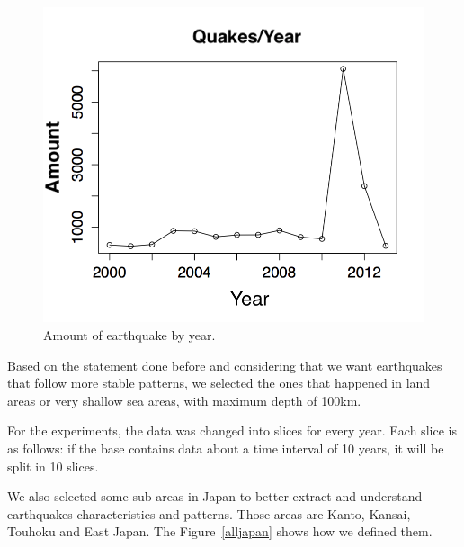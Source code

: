 \begin{figure}[]
\centering
\includegraphics[scale=0.5]{img/ocorrenciasAno.png}
\caption{Amount of earthquake by year.}
\label{ocorrenciasAno}
\end{figure}


Based on the statement done before and considering that we want
earthquakes that follow more stable patterns, we selected the ones
that happened in land areas or very shallow sea areas, with maximum
depth of 100km.

For the experiments, the data was changed into slices for every
year. Each slice is as follows: if the base contains data about a time
interval of 10 years, it will be split in 10 slices.

We also selected some sub-areas in Japan to better extract and
understand earthquakes characteristics and patterns. Those areas are
Kanto, Kansai, Touhoku and East Japan. The Figure~\ref{alljapan} shows
how we defined them.

